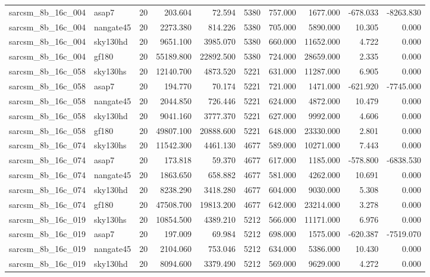 \documentclass{article}
\begin{document}
\begin{longtable}{llrrrrrrrr}
sarcsm\_8b\_16c\_004 & asap7 & 20 & 203.604 & 72.594 & 5380 & 757.000 & 1677.000 & -678.033 & -8263.830 \\
sarcsm\_8b\_16c\_004 & nangate45 & 20 & 2273.380 & 814.226 & 5380 & 705.000 & 5890.000 & 10.305 & 0.000 \\
sarcsm\_8b\_16c\_004 & sky130hd & 20 & 9651.100 & 3985.070 & 5380 & 660.000 & 11652.000 & 4.722 & 0.000 \\
sarcsm\_8b\_16c\_004 & gf180 & 20 & 55189.800 & 22892.500 & 5380 & 724.000 & 28659.000 & 2.335 & 0.000 \\
sarcsm\_8b\_16c\_058 & sky130hs & 20 & 12140.700 & 4873.520 & 5221 & 631.000 & 11287.000 & 6.905 & 0.000 \\
sarcsm\_8b\_16c\_058 & asap7 & 20 & 194.770 & 70.174 & 5221 & 721.000 & 1471.000 & -621.920 & -7745.000 \\
sarcsm\_8b\_16c\_058 & nangate45 & 20 & 2044.850 & 726.446 & 5221 & 624.000 & 4872.000 & 10.479 & 0.000 \\
sarcsm\_8b\_16c\_058 & sky130hd & 20 & 9041.160 & 3777.370 & 5221 & 627.000 & 9992.000 & 4.606 & 0.000 \\
sarcsm\_8b\_16c\_058 & gf180 & 20 & 49807.100 & 20888.600 & 5221 & 648.000 & 23330.000 & 2.801 & 0.000 \\
sarcsm\_8b\_16c\_074 & sky130hs & 20 & 11542.300 & 4461.130 & 4677 & 589.000 & 10271.000 & 7.443 & 0.000 \\
sarcsm\_8b\_16c\_074 & asap7 & 20 & 173.818 & 59.370 & 4677 & 617.000 & 1185.000 & -578.800 & -6838.530 \\
sarcsm\_8b\_16c\_074 & nangate45 & 20 & 1863.650 & 658.882 & 4677 & 581.000 & 4262.000 & 10.691 & 0.000 \\
sarcsm\_8b\_16c\_074 & sky130hd & 20 & 8238.290 & 3418.280 & 4677 & 604.000 & 9030.000 & 5.308 & 0.000 \\
sarcsm\_8b\_16c\_074 & gf180 & 20 & 47508.700 & 19813.200 & 4677 & 642.000 & 23214.000 & 3.278 & 0.000 \\
sarcsm\_8b\_16c\_019 & sky130hs & 20 & 10854.500 & 4389.210 & 5212 & 566.000 & 11171.000 & 6.976 & 0.000 \\
sarcsm\_8b\_16c\_019 & asap7 & 20 & 197.009 & 69.984 & 5212 & 698.000 & 1575.000 & -620.387 & -7519.070 \\
sarcsm\_8b\_16c\_019 & nangate45 & 20 & 2104.060 & 753.046 & 5212 & 634.000 & 5386.000 & 10.430 & 0.000 \\
sarcsm\_8b\_16c\_019 & sky130hd & 20 & 8094.600 & 3379.490 & 5212 & 569.000 & 9629.000 & 4.272 & 0.000 \\

\end{longtable}
\end{document}
